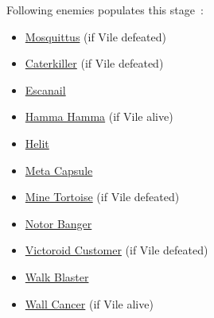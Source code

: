 Following enemies populates this stage~\cite{wiki:Doppler_stage}:
\begin{itemize}
	 \item \hyperlink{miniboss:Mosquittus}{Mosquittus} (if Vile defeated)
	 \item \hyperlink{enem:Caterkiller}{Caterkiller} (if Vile defeated)
	 \item \hyperlink{enem:Escanail}{Escanail}
	 \item \hyperlink{enem:Hamma_Hamma}{Hamma Hamma} (if Vile alive)
	 \item \hyperlink{enem:Helit}{Helit}
	 \item \hyperlink{enem:Meta_Capsule}{Meta Capsule}
	 \item \hyperlink{enem:Mine_Tortoise}{Mine Tortoise} (if Vile defeated)
	 \item \hyperlink{enem:Notor_Banger}{Notor Banger}
	 \item \hyperlink{enem:Victoroid_customer}{Victoroid Customer} (if Vile defeated)
	 \item \hyperlink{enem:Walk_Blaster}{Walk Blaster}
	 \item \hyperlink{enem:Wall_Cancer}{Wall Cancer} (if Vile alive)
\end{itemize}

